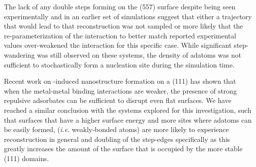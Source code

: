 The lack of any double steps forming on the (557) surface despite being seen
experimentally and in an earlier set of simulations suggest that either a
trajectory that would lead to that reconstruction was not sampled or more
likely that the re-parameterization of the  interaction to
better match reported experimental values over-weakened the interaction for
this specific case. While significant step-wandering was still observed on
these systems, the density of adatoms was not sufficient to stochastically form
a nucleation site during the simulation time.

Recent work on -induced nanostructure formation on a  (111) has
shown that when the metal-metal binding interactions are weaker, the presence
of strong repulsive adsorbates can be sufficient to disrupt even flat
surfaces.\citep{Eren:2016qt} We have reached a similar conclusion with the  systems
explored for this investigation, such that surfaces that have a higher surface
energy and more sites where adatoms can be easily formed, ({\em i.e.}
weakly-bonded atoms) are more likely to experience reconstruction in general
and doubling of the step-edges specifically as this greatly increases the
amount of the surface that is occupied by the more stable (111) domains.

